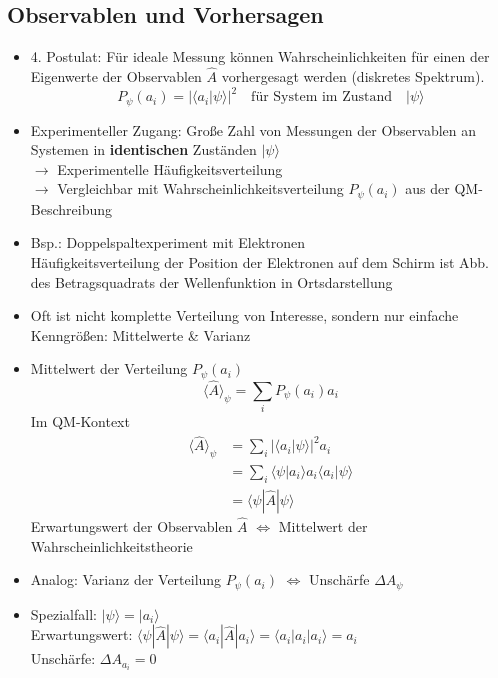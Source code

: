 \documentclass[10pt,article,colorback,accentcolor=tud9d]{scrartcl}
\begin{document}
\subsection{Observablen und Vorhersagen}
\begin{itemize}
	\item 4. Postulat: Für ideale Messung können Wahrscheinlichkeiten für einen der Eigenwerte der Observablen $\hat{A}$ vorhergesagt werden (diskretes Spektrum).
    \begin{equation}
      P_\psi(a_i)=\left|\langle a_i|\psi\rangle\right|^2 \quad \text{für System im Zustand} \quad |\psi\rangle
    \end{equation}
  \item Experimenteller Zugang: Große Zahl von Messungen der Observablen an Systemen in \textbf{identischen} Zuständen $|\psi\rangle$\\
    $\rightarrow$ Experimentelle Häufigkeitsverteilung\\
    $\rightarrow$ Vergleichbar mit Wahrscheinlichkeitsverteilung $P_\psi(a_i)$ aus der QM-Beschreibung
  \item Bsp.: Doppelspaltexperiment mit Elektronen\\
    Häufigkeitsverteilung der Position der Elektronen auf dem Schirm ist Abb. des Betragsquadrats der Wellenfunktion in Ortsdarstellung
  \item Oft ist nicht komplette Verteilung von Interesse, sondern nur einfache Kenngrößen: Mittelwerte \& Varianz
  \item Mittelwert der Verteilung $P_\psi(a_i)$
    \begin{equation}
    \langle\hat{A}\rangle_\psi=\sum_iP_\psi(a_i) a_i
    \end{equation}
    Im QM-Kontext
    \begin{align}
    \langle\hat{A}\rangle_\psi&=\sum_i\left|\langle a_i|\psi\rangle\right|^2a_i\\
    &=\sum_i\langle\psi|a_i\rangle a_i\langle a_i|\psi\rangle\\
    &=\langle\psi|\hat{A}|\psi\rangle
    \end{align}
    Erwartungswert der Observablen $\hat{A}$ $\Leftrightarrow$ Mittelwert der Wahrscheinlichkeitstheorie 
  \item Analog: Varianz der Verteilung $P_\psi(a_i)$ $\Leftrightarrow$ Unschärfe $\Delta A_\psi$
  \item Spezialfall: $|\psi\rangle=|a_i\rangle$\\
    Erwartungswert: $\langle\psi|\hat{A}|\psi\rangle=\langle a_i|\hat{A}|a_i\rangle=\langle a_i|a_i|a_i\rangle=a_i$\\
    Unschärfe: $\Delta A_{a_i}=0$
\end{itemize}
\end{document}
